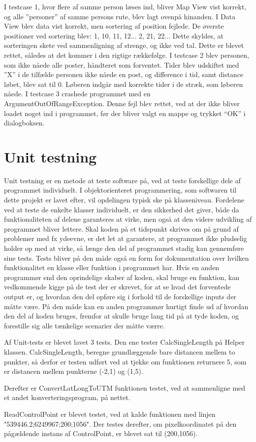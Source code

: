 I testcase 1, hvor flere af samme person læses ind, bliver Map View vist korrekt, og alle ”personer” af samme persons rute, blev lagt ovenpå hinanden. I Data View blev data vist korrekt, men sortering af position fejlede. De øverste positioner ved sortering blev: 1, 10, 11, 12... 2, 21, 22... Dette skyldes, at sorteringen skete ved sammenligning af strenge, og ikke ved tal. Dette er blevet rettet, således at det kommer i den rigtige rækkefølge.\newline
I testcase 2 blev personen, som ikke nåede alle poster, håndteret som forventet. Tider blev udskiftet med ”X” i de tilfælde personen ikke nåede en post, og difference i tid, samt distance løbet, blev sat til 0. Løberen indgår med korrekte tider i de stræk, som løberen nåede.\newline
I testcase 3 crashede programmet med en ArgumentOutOfRangeException. Denne fejl blev rettet, ved at der ikke bliver loadet noget ind i programmet, før der bliver valgt en mappe og trykket “OK” i dialogboksen.

\section{Unit testning}
Unit testning er en metode at teste software på, ved at teste forskellige dele af programmet individuelt. I objektorienteret programmering, som softwaren til dette projekt er lavet efter, vil opdelingen typisk ske på klasseniveau. Fordelene ved at teste de enkelte klasser individuelt, er den sikkerhed det giver, både da funktionaliteten af delene garanteres at virke, men også at den videre udvikling af programmet bliver lettere. Skal koden på et tidspunkt skrives om på grund af problemer med fx ydeevne, er det let at garantere, at programmet ikke pludselig holder op med at virke, så længe den del af programmet stadig kan gennemføre sine tests.
Tests bliver på den måde også en form for dokumentation over hvilken funktionalitet en klasse eller funktion i programmet har. Hvis en anden programmør end den oprindelige skaber af koden, skal bruge en funktion, kan vedkommende kigge på de test der er skrevet, for at se hvad det forventede output er, og hvordan den del opføre sig i forhold til de forskellige inputs der måtte være. På den måde kan en anden programmør hurtigt finde ud af hvordan den del af koden bruges, fremfor at skulle bruge lang tid på at tyde koden, og forestille sig alle tænkelige scenarier der måtte værre. 

Af Unit-tests er blevet lavet 3 tests. 
Den ene tester CalcSingleLength på Helper klassen. CalcSingleLength, beregne grundlæggende bare distancen mellem to punkter, så derfor er testen udført ved at tjekke om funktionen returnere 5, som er distancen mellem punkterne (-2,1) og (1,5).

Derefter er ConvertLatLongToUTM funktionen testet, ved at sammenligne med et andet konverteringsprogram, på nettet. \citep{LatLongConvert}  

ReadControlPoint er blevet testet, ved at kalde funktionen med linjen "539446.2;6249967;200;1056". Der testes derefter, om pixelkoordinatet på den pågældende instans af ControlPoint, er blevet sat til (200,1056).



